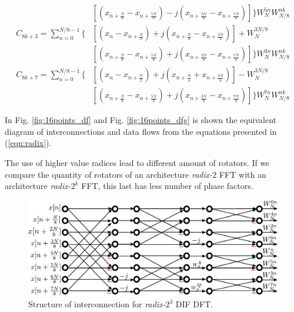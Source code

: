 \documentclass[journal,comsoc]{IEEEtran}
\begin{document}
\begin{small}
\begin{align}
&[(x_{n+\frac{N}{8}} - x_{n+\frac{5N}{8}}) -j (x_{n+\frac{3N}{8}} - x_{n+\frac{7N}{8}})] \bigg\} W_N^{5n} W_{N/8}^ {nk}    \nonumber\\
%
C_{8k+3} = \sum_{n=0}^{N/8-1} \bigg\{&[(x_n - x_{n+\frac{N}{2}}) +j (x_{n+\frac{N}{4}} - x_{n+\frac{3N}{4}})] + W_N^{3N/8} \nonumber\\
&[(x_{n+\frac{N}{8}} - x_{n+\frac{5N}{8}}) +j (x_{n+\frac{3N}{8}} - x_{n+\frac{7N}{8}})] \bigg\} W_N^{3n} W_{N/8}^ {nk}    \nonumber\\
%
C_{8k+7} = \sum_{n=0}^{N/8-1} \bigg\{&[(x_n - x_{n+\frac{N}{2}}) +j (x_{n+\frac{N}{4}} + x_{n+\frac{3N}{4}})] - W_N^{3N/8} \nonumber\\
&[(x_{n+\frac{N}{8}} - x_{n+\frac{5N}{8}}) +j (x_{n+\frac{3N}{8}} - x_{n+\frac{7N}{8}})] \bigg\} W_N^{7n} W_{N/8}^ {nk}    \nonumber	
\end{align}
\end{small}
\endgroup


In Fig. \ref{fig:16points_df} and Fig. \ref{fig:16points_dfg} is shown the equivalent diagram of interconnections and data flows from the equations presented in (\ref{eqn:radix}).

The use of higher value radices lead to different amount of rotators. If we compare the quantity of rotators of an architecture \textit{radix-}$2$ FFT with an architecture \textit{radix-}$2^k$ FFT, this last has less number of phase factors.
\\

\begin{figure} 
	\centering
	\includegraphics[width=\linewidth]{Diagramas/miSeccionFiguras/8PuntosRadix8Conexion.pdf}
	\caption{Structure of interconnection for \textit{radix-}$2^3$ DIF DFT.}
	\label{fig:8ponits_df}
\end{figure}
\end{document}
